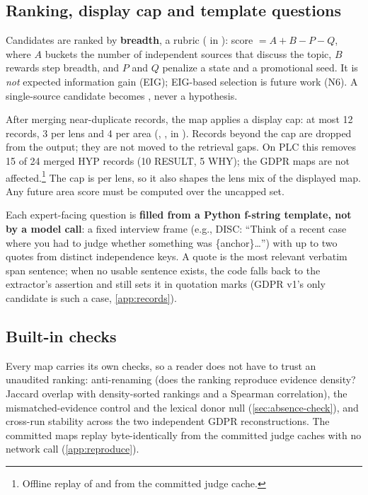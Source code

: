 \subsection{Ranking, display cap and template questions}

Candidates are ranked by \textbf{breadth}, a rubric ( in
): score $= A + B - P - Q$, where $A$ buckets the number of
independent sources that discuss the topic, $B$ rewards step breadth, and $P$ and $Q$ penalize a
 state and a promotional seed. It is \emph{not} expected information gain (EIG); EIG-based
selection is future work (N6). A single-source candidate becomes , never a
hypothesis.

\evobs{} After merging near-duplicate records, the map applies a display cap: at most 12 records, 3
per lens and 4 per area (, ,  in
). Records beyond the cap are dropped from the output; they are
not moved to the retrieval gaps. On PLC this removes 15 of 24 merged HYP records (10 RESULT, 5 WHY);
the GDPR maps are not affected.\footnote{Offline replay of  and 
from the committed judge cache.} The cap is per lens, so it also shapes the lens mix of the displayed
map. Any future area score must be computed over the uncapped set.

Each expert-facing question is \textbf{filled from a Python f-string template, not by a model
call}: a fixed interview frame (e.g., DISC: \enquote{Think of a recent case where you had to judge
whether something was \{anchor\}\ldots}) with up to two quotes from distinct independence keys. A
quote is the most relevant verbatim span sentence; when no usable sentence exists, the code falls
back to the extractor's assertion and still sets it in quotation marks (GDPR v1's only candidate is
such a case, \cref{app:records}).

\subsection{Built-in checks}

Every map carries its own checks, so a reader does not have to trust an unaudited ranking:
anti-renaming (does the ranking reproduce evidence density? Jaccard overlap with density-sorted
rankings and a Spearman correlation), the mismatched-evidence control and the lexical donor
null (\cref{sec:absence-check}), and cross-run stability across the two independent GDPR
reconstructions. The committed maps replay byte-identically from the committed judge caches with no
network call (\cref{app:reproduce}).


